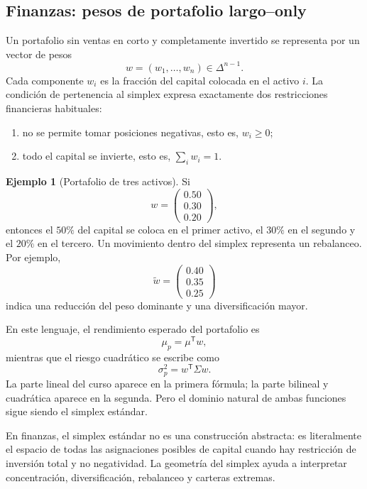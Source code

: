 \documentclass[10pt,a4paper,oneside]{article}
\theoremstyle{plain}
\theoremstyle{definition}
\newtheorem{example}[theorem]{Ejemplo}
\theoremstyle{remark}
\begin{document}
\subsection{Finanzas: pesos de portafolio largo--only}

Un portafolio sin ventas en corto y completamente invertido se representa por un vector de pesos
\[
w=(w_1,\dots,w_n)\in\Delta^{n-1}.
\]
Cada componente $w_i$ es la fracción del capital colocada en el activo $i$. La condición de pertenencia al simplex expresa exactamente dos restricciones financieras habituales:
\begin{enumerate}[label=\textup{(\roman*)}]
\item no se permite tomar posiciones negativas, esto es, $w_i\ge 0$;
\item todo el capital se invierte, esto es, $\sum_i w_i=1$.
\end{enumerate}

\begin{example}[Portafolio de tres activos]
Si
\[
w=
\begin{pmatrix}
0.50\\0.30\\0.20
\end{pmatrix},
\]
entonces el $50\%$ del capital se coloca en el primer activo, el $30\%$ en el segundo y el $20\%$ en el tercero. Un movimiento dentro del simplex representa un rebalanceo. Por ejemplo,
\[
\widetilde w=
\begin{pmatrix}
0.40\\0.35\\0.25
\end{pmatrix}
\]
indica una reducción del peso dominante y una diversificación mayor.
\end{example}

En este lenguaje, el rendimiento esperado del portafolio es
\[
\mu_p=\mu^{\mathsf T}w,
\]
mientras que el riesgo cuadrático se escribe como
\[
\sigma_p^2=w^{\mathsf T}\Sigma w.
\]
La parte lineal del curso aparece en la primera fórmula; la parte bilineal y cuadrática aparece en la segunda. Pero el dominio natural de ambas funciones sigue siendo el simplex estándar.

\begin{summaryBox}
En finanzas, el simplex estándar no es una construcción abstracta: es literalmente el espacio de todas las asignaciones posibles de capital cuando hay restricción de inversión total y no negatividad. La geometría del simplex ayuda a interpretar concentración, diversificación, rebalanceo y carteras extremas.
\end{summaryBox}
\end{document}
